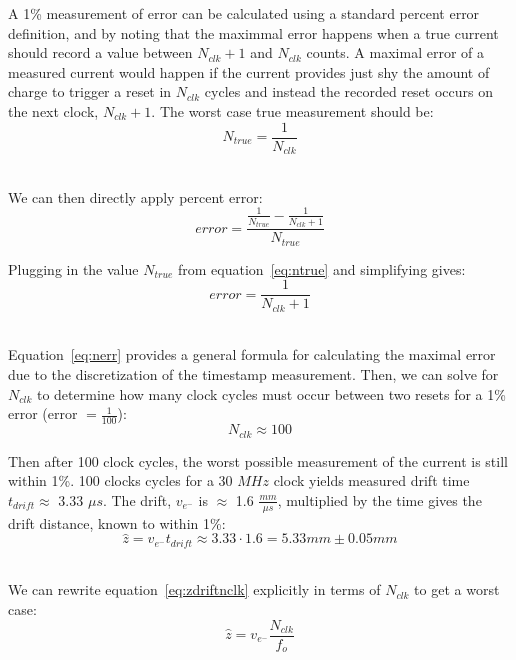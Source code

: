 A 1\% measurement of error can be calculated using a standard percent error definition, and by noting that the maximmal error happens when a true current should record a value between $N_{clk}+1$ and $N_{clk}$ counts.
A maximal error of a measured current would happen if the current provides just shy the amount of charge to trigger a reset in $N_{clk}$ cycles and instead the recorded reset occurs on the next clock, $N_{clk} + 1$.
The worst case true measurement should be:
\begin{equation}
  N_{true} = \frac{1}{N_{clk}}
\end{equation}~\label{eq:ntrue}

We can then directly apply percent error:
\begin{equation}
  error = \frac{\frac{1}{N_{true}} - \frac{1}{N_{clk}+1}}{N_{true}}
\end{equation}

Plugging in the value $N_{true}$ from equation~\ref{eq:ntrue} and simplifying gives:
\begin{equation}
  error = \frac{1}{N_{clk}+1}
\end{equation}~\label{eq:nerr}

Equation~\ref{eq:nerr} provides a general formula for calculating the maximal error due to the discretization of the timestamp measurement.
Then, we can solve for $N_{clk}$ to determine how many clock cycles must occur between two resets for a 1\% error (error $= \frac{1}{100}$):
\begin{equation}
  N_{clk} \approx 100
\end{equation}

Then after 100 clock cycles, the worst possible measurement of the current is still within 1\%.
100 clocks cycles for a 30 $\unit{MHz}$ clock yields measured drift time $t_{drift} \approx$ 3.33 $\unit{\mu s}$.
The drift, $v_{e^{-}}$ is $\approx$ 1.6 $\unit{\frac{mm}{\mu s}}$, multiplied by the time gives the drift distance, known to within 1\%:
\begin{equation}
  \hat{z} = v_{e^{-}}t_{drift} \approx 3.33 \cdot 1.6 = 5.33 \unit{mm} \pm 0.05 \unit{mm}
\end{equation}~\label{eq:zdriftnclk}

We can rewrite equation~\ref{eq:zdriftnclk} explicitly in terms of $N_{clk}$ to get a worst case:
\begin{equation}
  \hat{z} = v_{e^{-}}\frac{N_{clk}}{f_{o}}
\end{equation}~\label{eq:zdriftworse}


